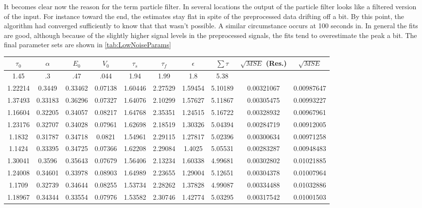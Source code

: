 It becomes clear now the reason for the term particle filter. In several locations the output
of the particle filter looks like a filtered version of the input. For instance toward the
end, the estimates stay flat in spite of the preprocessed data drifting off a bit. By
this point, the algorithm had converged sufficiently to know that that wasn't possible.
A similar circumstance occurs at 100 seconds in. In general the fits are good, although because
of the slightly higher signal levels in the preprocessed signals, the fits tend to overestimate
the peak a bit. The final parameter sets are shown in \autoref{tab:LowNoiseParams}
\begin{table}[t]
\centering
\begin{tabular}{|c | c | c | c | c | c | c | c | c | c |}
\hline 
$\tau_0$ & $\alpha$ & $E_0$    & $V_0$    & $\tau_s$ & $\tau_f$ & $\epsilon$  & $ \sum \tau $ & $\sqrt{MSE}$ (Res.) &$\sqrt{MSE}$\\
\hline 
\rowcolor[gray]{.8}
1.45 & .3 & .47 & .044 & 1.94 & 1.99 & 1.8  & 5.38 &  & \\
\hline 
\hline 
1.22214 & 0.3449 & 0.33462 & 0.07138 & 1.60446 & 2.27529 & 1.59454 & 5.10189  &  0.00321067  & 0.00987647  \\
1.37493 & 0.33183 & 0.36296 & 0.07327 & 1.64076 & 2.10299 & 1.57627 & 5.11867 &  0.00305475  & 0.00993227  \\
1.16604 & 0.32205 & 0.34057 & 0.08217 & 1.64768 & 2.35351 & 1.24515 & 5.16722 &  0.00328932  & 0.00967961  \\
1.23176 & 0.32707 & 0.34028 & 0.07961 & 1.62698 & 2.18519 & 1.30326 & 5.04394 &  0.00284719  & 0.00912005  \\
1.1832 & 0.31787 & 0.34718 & 0.0821 & 1.54961 & 2.29115 & 1.27817 & 5.02396   &  0.00300634  & 0.00971258  \\
1.1424 & 0.33395 & 0.34725 & 0.07366 & 1.62208 & 2.29084 & 1.4025 & 5.05531   &  0.00283287  & 0.00948483  \\
1.30041 & 0.3596 & 0.35643 & 0.07679 & 1.56406 & 2.13234 & 1.60338 & 4.99681  &  0.00302802  & 0.01021885  \\
1.24008 & 0.34601 & 0.33978 & 0.08903 & 1.64989 & 2.23655 & 1.29004 & 5.12651 &  0.00304378  & 0.01007964  \\
1.1709 & 0.32739 & 0.34644 & 0.08255 & 1.53734 & 2.28262 & 1.37828 & 4.99087  &  0.00334488  & 0.01032886  \\
1.18967 & 0.34344 & 0.33554 & 0.07976 & 1.53582 & 2.30746 & 1.42774 & 5.03295 &  0.00317542  & 0.01001503  \\

\end{tabular}
\end{table}
